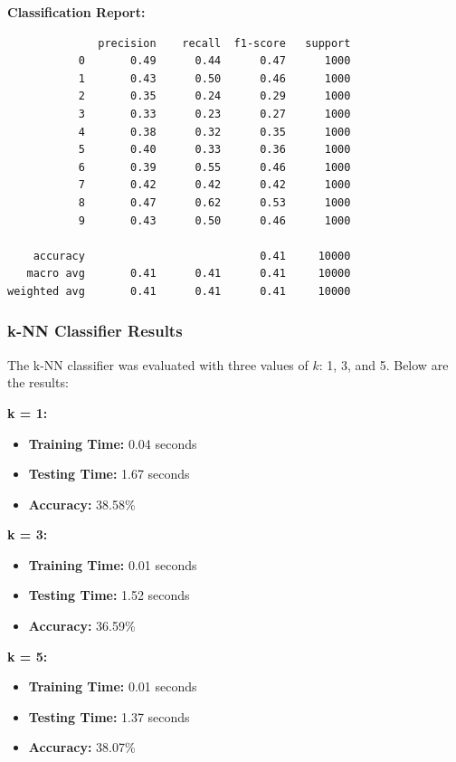 \documentclass[lettersize,journal]{IEEEtran}
\begin{document}
\textbf{Classification Report:}
\begin{scriptsize}
\begin{verbatim}
              precision    recall  f1-score   support
           0       0.49      0.44      0.47      1000
           1       0.43      0.50      0.46      1000
           2       0.35      0.24      0.29      1000
           3       0.33      0.23      0.27      1000
           4       0.38      0.32      0.35      1000
           5       0.40      0.33      0.36      1000
           6       0.39      0.55      0.46      1000
           7       0.42      0.42      0.42      1000
           8       0.47      0.62      0.53      1000
           9       0.43      0.50      0.46      1000

    accuracy                           0.41     10000
   macro avg       0.41      0.41      0.41     10000
weighted avg       0.41      0.41      0.41     10000
\end{verbatim}
\end{scriptsize}

\subsubsection{\textbf{k-NN Classifier Results}}
The k-NN classifier was evaluated with three values of $k$: 1, 3, and 5. Below are the results:

\textbf{k = 1:}
\begin{itemize}
    \item \textbf{Training Time:} 0.04 seconds
    \item \textbf{Testing Time:} 1.67 seconds
    \item \textbf{Accuracy:} 38.58\%
\end{itemize}

\textbf{k = 3:}
\begin{itemize}
    \item \textbf{Training Time:} 0.01 seconds
    \item \textbf{Testing Time:} 1.52 seconds
    \item \textbf{Accuracy:} 36.59\%
\end{itemize}

\textbf{k = 5:}
\begin{itemize}
    \item \textbf{Training Time:} 0.01 seconds
    \item \textbf{Testing Time:} 1.37 seconds
    \item \textbf{Accuracy:} 38.07\%
\end{itemize}
\end{document}
